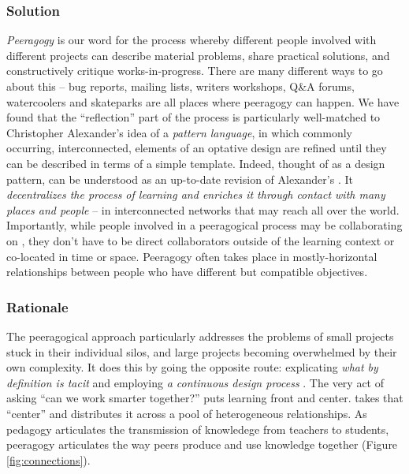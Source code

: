 \subsubsection*{Solution} \emph{Peeragogy} is our word for the process whereby different people involved with different projects can describe material problems, share practical solutions, and constructively critique works-in-progress.   There are many different ways to go about this -- bug reports, mailing lists, writers workshops, Q\&A forums, watercoolers and skateparks are all places where peeragogy can happen.  We have found that the ``reflection'' part of the process is particularly well-matched to Christopher Alexander's idea of a \emph{pattern language}, in which commonly occurring,  interconnected, elements of an optative design are refined until they can be described in terms of a simple template.  Indeed, thought of as a design pattern,  can be understood as an up-to-date revision of Alexander's  \cite[p. 99]{alexander1977pattern}.  It \emph{decentralizes the process of learning and enriches it through contact with many places and people} -- in interconnected networks that may reach all over the world.   Importantly, while people involved in a peeragogical process may be collaborating on , they don't have to be direct collaborators outside of the learning context or co-located in time or space.  Peeragogy often takes place in mostly-horizontal relationships between people who have different but compatible objectives.  

\subsubsection*{Rationale}
The peeragogical approach  particularly addresses the problems of small projects stuck in their individual silos, and large projects becoming overwhelmed by their own complexity.  It does this by going the opposite route: explicating \emph{what by definition is tacit} and employing \emph{a continuous design process} \cite[pp. 9--10]{schummer2014beyond}.  The very act of asking ``can we work smarter together?'' puts learning front and center.   takes that ``center'' and distributes it across a pool of heterogeneous relationships.  As pedagogy articulates the transmission of knowledege from teachers to students, peeragogy articulates the way peers produce and use knowledge together (Figure \ref{fig:connections}).

